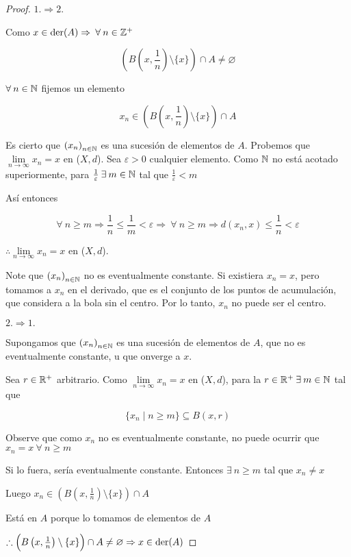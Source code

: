 \begin{proof}
    $1. \Rightarrow 2.$

    Como $x \in \mathrm{der}(A) \Rightarrow \: \forall \: n \in \mathbb{Z}^+$

    $$ \left( B\left(x,\frac{1}{n}\right) \setminus \{ x \} \right) \cap A \neq \varnothing $$

    $\forall \: n \in \mathbb{N}$ fijemos un elemento 

    $$x_n \in \left( B\left(x,\frac{1}{n}\right) \setminus \{ x \} \right) \cap A$$

    Es cierto que ${(x_n)}_{n \in \mathbb{N}}$ es una sucesión de elementos de $A$. Probemos que $\lim\limits_{n \to \infty} x_n = x$ en ($X,d$). Sea $\varepsilon > 0$ cualquier elemento. Como $\mathbb{N}$ no está acotado superiormente, para $\frac{1}{\varepsilon} \: \exists \: m \in \mathbb{N} $ tal que $\frac{1}{\varepsilon} < m$

    Así entonces

    $$\forall \: n \geqslant m \Rightarrow \frac{1}{n} \leqslant \frac{1}{m} < \varepsilon \Rightarrow \: \forall \: n \geqslant m \Rightarrow d(x_n,x) \leqslant \frac{1}{n} < \varepsilon$$

    $\therefore \lim\limits_{n \to \infty} x_n = x$ en ($X,d$). 
    
    Note que ${(x_n)}_{n \in \mathbb{N}}$ no es eventualmente constante. Si existiera $x_n = x$, pero tomamos a $x_n$ en el derivado, que es el conjunto de los puntos de acumulación, que considera a la bola sin el centro. Por lo tanto, $x_n$ no puede ser el centro.

    $2. \Rightarrow 1.$

    Supongamos que ${(x_n)}_{n \in \mathbb{N}}$ es una sucesión de elementos de $A$, que no es eventualmente constante, u que onverge a $x$. 

    Sea $r \in \mathbb{R}^+$ arbitrario. Como $\lim\limits_{n \to \infty} x_n = x$ en ($X,d$), para la $r \in \mathbb{R}^+ \: \exists \: m \in \mathbb{N}$ tal que

    $$\{ x_n \mid n \geqslant m \} \subseteq B(x,r)$$

    Observe que como $x_n$ no es eventualmente constante, no puede ocurrir que $x_n = x \: \forall \: n \geqslant m$

    Si lo fuera, sería eventualmente constante. Entonces $\exists \: n \geqslant m$ tal que $x_n \neq x$

    Luego $x_n \in \left( B\left(x,\frac{1}{n}\right) \setminus \{ x \} \right) \cap A$

    Está en $A$ porque lo tomamos de elementos de $A$

    $\therefore \left( B\left(x,\frac{1}{n}\right) \setminus \{ x \} \right) \cap A \neq \varnothing \Rightarrow x \in \mathrm{der}(A)$
\end{proof}

